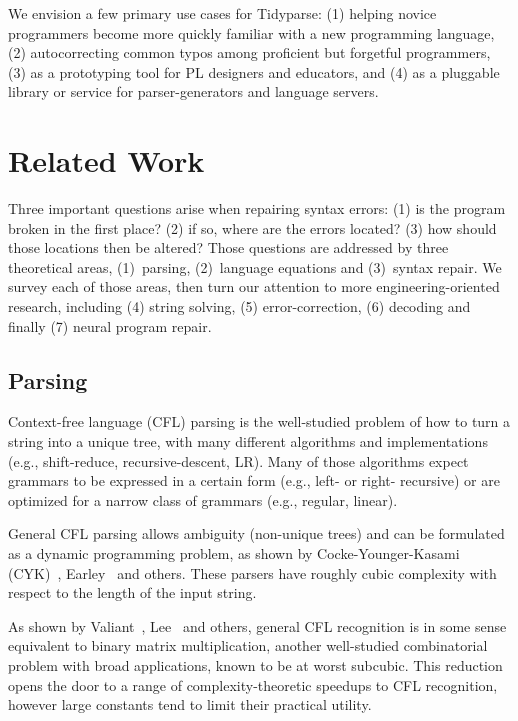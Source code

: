 \documentclass[sigplan,review,acmsmall,nonacm,screen,anonymous]{acmart}\settopmatter{printfolios=false,printccs=false,printacmref=false}
\begin{document}
We envision a few primary use cases for Tidyparse: (1) helping novice programmers become more quickly familiar with a new programming language, (2) autocorrecting common typos among proficient but forgetful programmers, (3) as a prototyping tool for PL designers and educators, and (4) as a pluggable library or service for parser-generators and language servers.

\clearpage\section{Related Work}\label{sec:related}

Three important questions arise when repairing syntax errors: (1) is the program broken in the first place? (2) if so, where are the errors located? (3) how should those locations then be altered? Those questions are addressed by three theoretical areas, (1)~parsing, (2)~language equations and (3)~syntax repair. We survey each of those areas, then turn our attention to more engineering-oriented research, including (4) string solving, (5) error-correction, (6) decoding and finally (7) neural program repair.

\subsection{Parsing}

Context-free language (CFL) parsing is the well-studied problem of how to turn a string into a unique tree, with many different algorithms and implementations (e.g., shift-reduce, recursive-descent, LR). Many of those algorithms expect grammars to be expressed in a certain form (e.g., left- or right- recursive) or are optimized for a narrow class of grammars (e.g., regular, linear).

General CFL parsing allows ambiguity (non-unique trees) and can be formulated as a dynamic programming problem, as shown by Cocke-Younger-Kasami (CYK)~\cite{sakai1961syntax}, Earley~\cite{earley1970efficient} and others. These parsers have roughly cubic complexity with respect to the length of the input string.

As shown by Valiant~\cite{valiant1975general}, Lee~\cite{lee2002fast} and others, general CFL recognition is in some sense equivalent to binary matrix multiplication, another well-studied combinatorial problem with broad applications, known to be at worst subcubic. This reduction opens the door to a range of complexity-theoretic speedups to CFL recognition, however large constants tend to limit their practical utility.
\end{document}
